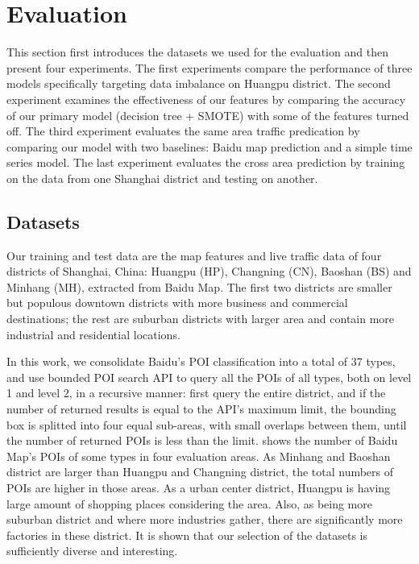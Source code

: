 \section{Evaluation}
This section first introduces the datasets we used for 
the evaluation and then present four experiments. The first experiments
compare the performance of three models specifically targeting
data imbalance on Huangpu district. The second experiment examines
the effectiveness of our features by comparing the accuracy of our
primary model (decision tree + SMOTE) with some of the features
turned off. The third experiment evaluates the same area traffic
predication by comparing our model with two baselines: Baidu map
prediction and a simple time series model. The last experiment
evaluates the cross area prediction by training on the data from one
Shanghai district and testing on another.

\subsection{Datasets}
Our training and test data are the map features and live traffic data 
of four districts of Shanghai, China: Huangpu (HP), Changning (CN), 
Baoshan (BS) and Minhang (MH), extracted from Baidu Map. 
The first two districts are smaller but populous downtown districts 
with more business and commercial
destinations; the rest are suburban districts with larger area and 
contain more industrial and residential locations. 

In this work, we consolidate Baidu's POI classification into
a total of 37 types, and use bounded POI search API to query
all the POIs of all types, both on level 1 and level 2,
in a recursive manner: first query the entire district,
and if the number of returned results is equal to the API's maximum limit,
the bounding box is splitted into four equal sub-areas, with
small overlaps between them, until the number of returned POIs is less
than the limit.  shows the number of Baidu Map's 
POIs of some types in four evaluation areas. As Minhang and Baoshan 
district are larger than Huangpu and Changning district, the 
total numbers of POIs are higher in those areas. As a urban center district, 
Huangpu is having large amount of shopping places considering the area. 
Also, as being more suburban district and where more 
industries gather, there are significantly more factories 
in these district. It is shown that our selection of the 
datasets is sufficiently diverse and interesting.

